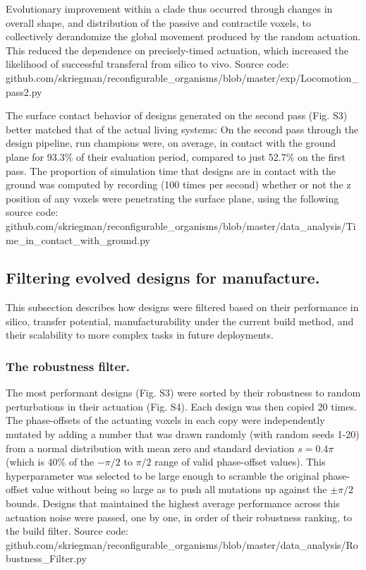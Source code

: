 Evolutionary improvement within a clade thus occurred through changes in overall shape, and distribution of the passive and contractile voxels, to collectively derandomize the global movement produced by the random actuation. This reduced the dependence on precisely-timed actuation, which increased the likelihood of successful transferal from silico to vivo. Source code: github.com/skriegman/reconfigurable\_organisms/blob/master/exp/Locomotion\_pass2.py

The surface contact behavior of designs generated on the second pass (Fig. S3) better matched that of the actual living systems: On the second pass through the design pipeline, run champions were, on average, in contact with the ground plane for 93.3\% of their evaluation period, compared to just 52.7\% on the first pass. The proportion of simulation time that designs are in contact with the ground was computed by recording (100 times per second) whether or not the z position of any voxels were penetrating the surface plane, using the following source code: github.com/skriegman/reconfigurable\_organisms/blob/master/data\_analysis/Time\_in\_contact\_with\_ground.py


\subsection*{Filtering evolved designs for manufacture.}

This subsection describes how designs were filtered based on their performance in silico, transfer potential, manufacturability under the current build method, and their scalability to more complex tasks in future deployments.

\subsubsection*{The robustness filter.}

The most performant designs (Fig. S3) were sorted by their robustness to random perturbations in their actuation (Fig. S4). Each design was then copied 20 times. The phase-offsets of the actuating voxels in each copy were independently mutated by adding a number that was drawn randomly (with random seeds 1-20) from a normal distribution with mean zero and standard deviation {$s = 0.4\pi$} (which is 40\% of the {$-\pi/2$} to {$\pi/2$} range of valid phase-offset values). This hyperparameter was selected to be large enough to scramble the original phase-offset value without being so large as to push all mutations up against the {$\pm\pi/2$} bounds. Designs that maintained the highest average performance across this actuation noise were passed, one by one, in order of their robustness ranking, to the build filter. Source code: github.com/skriegman/reconfigurable\_organisms/blob/master/data\_analysis/Robustness\_Filter.py 

